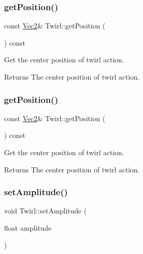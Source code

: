 \subsubsection{\texorpdfstring{get\+Position()}{getPosition()}\hspace{0.1cm}{\footnotesize\ttfamily [1/2]}}
{\footnotesize\ttfamily const \hyperlink{classVec2}{Vec2}\& Twirl\+::get\+Position (\begin{DoxyParamCaption}{ }\end{DoxyParamCaption}) const\hspace{0.3cm}{\ttfamily [inline]}}



Get the center position of twirl action. 

\begin{DoxyReturn}{Returns}
The center position of twirl action. 
\end{DoxyReturn}
\mbox{\label{classTwirl_aad84af7fd087bb5d5442b13737e1004d}} 
\subsubsection{\texorpdfstring{get\+Position()}{getPosition()}\hspace{0.1cm}{\footnotesize\ttfamily [2/2]}}
{\footnotesize\ttfamily const \hyperlink{classVec2}{Vec2}\& Twirl\+::get\+Position (\begin{DoxyParamCaption}{ }\end{DoxyParamCaption}) const\hspace{0.3cm}{\ttfamily [inline]}}



Get the center position of twirl action. 

\begin{DoxyReturn}{Returns}
The center position of twirl action. 
\end{DoxyReturn}
\mbox{\label{classTwirl_abfc08e832e96fcddce09d0e26c84cf91}} 
\subsubsection{\texorpdfstring{set\+Amplitude()}{setAmplitude()}\hspace{0.1cm}{\footnotesize\ttfamily [1/2]}}
{\footnotesize\ttfamily void Twirl\+::set\+Amplitude (\begin{DoxyParamCaption}\item[{float}]{amplitude }\end{DoxyParamCaption})\hspace{0.3cm}{\ttfamily [inline]}}



